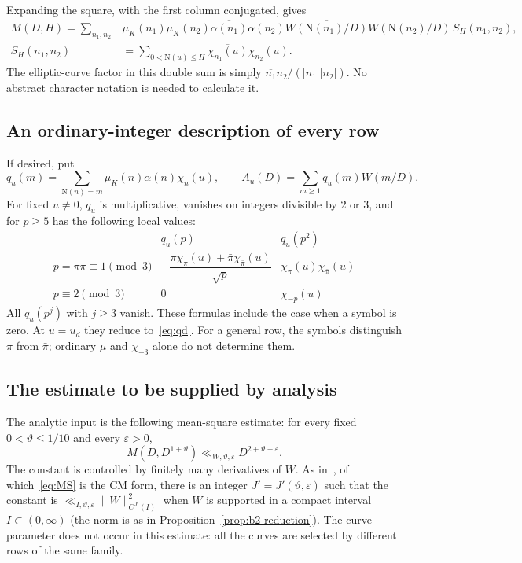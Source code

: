 \documentclass[11pt]{article}
\numberwithin{equation}{section}
\newcommand{\N}{\mathrm N}
\newcommand{\muk}{\mu_K}
\begin{document}
Expanding the square, with the first column conjugated, gives
\begin{equation}\label{eq:double}
\begin{split}
 M(D,H)=\sum_{n_1,n_2}&\muk(n_1)\muk(n_2)
 \overline{\alpha(n_1)}\alpha(n_2)
 \overline{W(\N(n_1)/D)}W(\N(n_2)/D)\,S_H(n_1,n_2),\\
 S_H(n_1,n_2)&=\sum_{0<\N(u)\le H}
                 \overline{\chi_{n_1}(u)}\chi_{n_2}(u).
\end{split}
\end{equation}
The elliptic-curve factor in this double sum is simply
$\overline{n_1}n_2/(|n_1||n_2|)$. No abstract character notation is
needed to calculate it.

\subsection{An ordinary-integer description of every row}
If desired, put
\begin{equation}\label{eq:d017}
 q_u(m)=\sum_{\N(n)=m}\muk(n)\alpha(n)\chi_n(u),\qquad
 A_u(D)=\sum_{m\ge1}q_u(m)W(m/D).
\end{equation}
For fixed $u\ne0$, $q_u$ is multiplicative, vanishes on integers divisible
by $2$ or $3$, and for $p\ge5$ has the following local values:
\begin{equation}\label{eq:allrows}
\begin{array}{c|cc}
 &q_u(p)&q_u(p^2)\\\hline
 p=\pi\bar\pi\equiv1\pmod3
 &-\dfrac{\pi\chi_\pi(u)+\bar\pi\chi_{\bar\pi}(u)}{\sqrt p}
 &\chi_\pi(u)\chi_{\bar\pi}(u)\\[2ex]
 p\equiv2\pmod3&0&\chi_{-p}(u)
\end{array}
\end{equation}
All $q_u(p^j)$ with $j\ge3$ vanish. These formulas include the case
when a symbol is zero. At $u=u_d$ they reduce to~\eqref{eq:qd}.
For a general row, the symbols distinguish $\pi$ from $\bar\pi$;
ordinary $\mu$ and $\chi_{-3}$ alone do not determine them.

\subsection{The estimate to be supplied by analysis}
The analytic input is the following mean-square estimate: for every fixed
$0<\vartheta\le1/10$ and every $\varepsilon>0$,
\begin{equation}\label{eq:MS}
 \boxed{\quad M(D,D^{1+\vartheta})
       \ll_{W,\vartheta,\varepsilon}D^{2+\vartheta+\varepsilon}.
       \quad}
\end{equation}
The constant is controlled by finitely many derivatives of $W$. As in~\cite[Proposition~3.1]{OAI1112},
of which~\eqref{eq:MS} is the CM form, there is an integer $J'=J'(\vartheta,\varepsilon)$ such that the constant is
$\ll_{I,\vartheta,\varepsilon}\|W\|_{C^{J'}(I)}^2$ when $W$ is supported in a compact interval $I\subset(0,\infty)$
(the norm is as in Proposition~\ref{prop:b2-reduction}).
The curve parameter does not occur in this estimate: all the curves are
selected by different rows of the same family.
\end{document}
